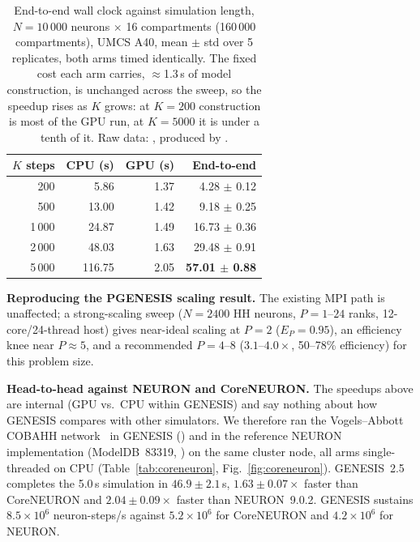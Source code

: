 \documentclass[preprint,12pt, a4paper]{elsarticle}
\begin{document}
\begin{enumerate}
\begin{table}[!h]
\centering
\small
\begin{tabular}{|r|r|r|r|}
\hline
\textbf{$K$ steps} & \textbf{CPU (s)} & \textbf{GPU (s)} & \textbf{End-to-end} \\
\hline
200   & 5.86   & 1.37 & 4.28 $\pm$ 0.12 \\
\hline
500   & 13.00  & 1.42 & 9.18 $\pm$ 0.25 \\
\hline
1\,000  & 24.87  & 1.49 & 16.73 $\pm$ 0.36 \\
\hline
2\,000  & 48.03  & 1.63 & 29.48 $\pm$ 0.91 \\
\hline
5\,000  & 116.75 & 2.05 & \textbf{57.01 $\pm$ 0.88} \\
\hline
\end{tabular}
\caption{End-to-end wall clock against simulation length, $N=10\,000$ neurons $\times$ 16 compartments (160\,000 compartments), UMCS A40, mean $\pm$ std over 5 replicates, both arms timed identically. The fixed cost each arm carries, $\approx$1.3\,s of model construction, is unchanged across the sweep, so the speedup rises as $K$ grows: at $K=200$ construction is most of the GPU run, at $K=5000$ it is under a tenth of it. Raw data: \protect{}, produced by \protect{}.}
\label{tab:mcksweep}
\end{table}



\textbf{Reproducing the PGENESIS scaling result.} The existing MPI path is unaffected; a strong-scaling sweep ($N=2400$ HH neurons, $P=1$--$24$ ranks, 12-core/24-thread host) gives near-ideal scaling at $P=2$ ($E_P=0.95$), an efficiency knee near $P\approx5$, and a recommended $P=4$--$8$ ($3.1$--$4.0\times$, 50--78\% efficiency) for this problem size.

\textbf{Head-to-head against NEURON and CoreNEURON.} The speedups above are internal (GPU vs.\ CPU within GENESIS) and say nothing about how GENESIS compares with other simulators. We therefore ran the Vogels--Abbott COBAHH network~\cite{vogels2005signal,brette2007simulation} in GENESIS () and in the reference NEURON implementation (ModelDB~83319, ) on the same cluster node, all arms single-threaded on CPU (Table~\ref{tab:coreneuron}, Fig.~\ref{fig:coreneuron}). GENESIS~2.5 completes the 5.0\,s simulation in $46.9\pm2.1$\,s, $1.63\pm0.07\times$ faster than CoreNEURON and $2.04\pm0.09\times$ faster than NEURON~9.0.2. GENESIS sustains $8.5\times10^{6}$ neuron-steps/s against $5.2\times10^{6}$ for CoreNEURON and $4.2\times10^{6}$ for NEURON.


\end{enumerate}
\end{document}

